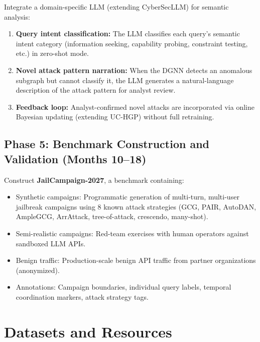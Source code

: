 \documentclass[12pt,a4paper]{article}
\begin{document}
Integrate a domain-specific LLM (extending CyberSecLLM) for semantic analysis:

\begin{enumerate}
    \item \textbf{Query intent classification:} The LLM classifies each query's semantic intent category (information seeking, capability probing, constraint testing, etc.) in zero-shot mode.
    \item \textbf{Novel attack pattern narration:} When the DGNN detects an anomalous subgraph but cannot classify it, the LLM generates a natural-language description of the attack pattern for analyst review.
    \item \textbf{Feedback loop:} Analyst-confirmed novel attacks are incorporated via online Bayesian updating (extending UC-HGP) without full retraining.
\end{enumerate}

\subsection{Phase 5: Benchmark Construction and Validation (Months 10--18)}

Construct \textbf{JailCampaign-2027}, a benchmark containing:

\begin{itemize}
    \item Synthetic campaigns: Programmatic generation of multi-turn, multi-user jailbreak campaigns using 8 known attack strategies (GCG, PAIR, AutoDAN, AmpleGCG, ArrAttack, tree-of-attack, crescendo, many-shot).
    \item Semi-realistic campaigns: Red-team exercises with human operators against sandboxed LLM APIs.
    \item Benign traffic: Production-scale benign API traffic from partner organizations (anonymized).
    \item Annotations: Campaign boundaries, individual query labels, temporal coordination markers, attack strategy tags.
\end{itemize}

\section{Datasets and Resources}
\end{document}
